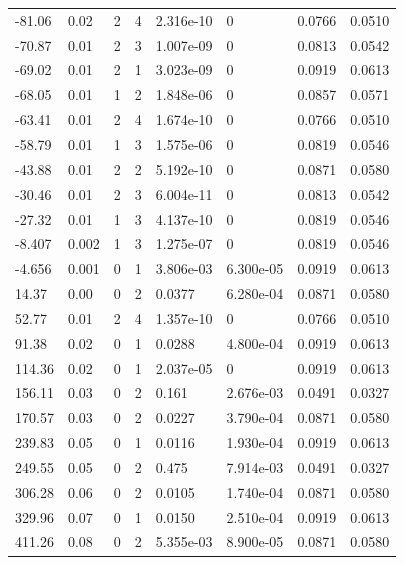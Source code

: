 \documentclass[preview]{standalone}
\begin{document}
{{\begin{tabular}{L{1.2cm}C{1.2cm} C{0.3cm}C{0.5cm} C{1.4cm}C{1.4cm} C{1.4cm}C{1.4cm}}
  -81.06  &  0.02  & 2     &  4 &  2.316e-10  & 0  & 0.0766 &  0.0510   \\ 
  -70.87  &  0.01  & 2     &  3 &  1.007e-09  & 0  & 0.0813 &  0.0542   \\ 
  -69.02  &  0.01  & 2     &  1 &  3.023e-09  & 0  & 0.0919 &  0.0613   \\ 
  -68.05  &  0.01  & 1     &  2 &  1.848e-06  & 0  & 0.0857 &  0.0571   \\ 
  -63.41  &  0.01  & 2     &  4 &  1.674e-10  & 0  & 0.0766 &  0.0510   \\ 
  -58.79  &  0.01  & 1     &  3 &  1.575e-06  & 0  & 0.0819 &  0.0546   \\ 
  -43.88  &  0.01  & 2     &  2 &  5.192e-10  & 0  & 0.0871 &  0.0580   \\ 
  -30.46  &  0.01  & 2     &  3 &  6.004e-11  & 0  & 0.0813 &  0.0542   \\ 
  -27.32  &  0.01  & 1     &  3 &  4.137e-10  & 0  & 0.0819 &  0.0546   \\ 
  -8.407  &  0.002  & 1     &  3 &  1.275e-07  & 0  & 0.0819 &  0.0546   \\ 
  -4.656  &  0.001  & 0     &  1 &  3.806e-03  & 6.300e-05  & 0.0919 &  0.0613   \\ 
  14.37  &  0.00  & 0     &  2 &  0.0377  & 6.280e-04  & 0.0871 &  0.0580   \\ 
  52.77  &  0.01  & 2     &  4 &  1.357e-10  & 0  & 0.0766 &  0.0510   \\ 
  91.38  &  0.02  & 0     &  1 &  0.0288  & 4.800e-04  & 0.0919 &  0.0613   \\ 
  114.36  &  0.02  & 0     &  1 &  2.037e-05  & 0  & 0.0919 &  0.0613   \\ 
  156.11  &  0.03  & 0     &  2 &  0.161  & 2.676e-03  & 0.0491 &  0.0327   \\ 
  170.57  &  0.03  & 0     &  2 &  0.0227  & 3.790e-04  & 0.0871 &  0.0580   \\ 
  239.83  &  0.05  & 0     &  1 &  0.0116  & 1.930e-04  & 0.0919 &  0.0613   \\ 
  249.55  &  0.05  & 0     &  2 &  0.475  & 7.914e-03  & 0.0491 &  0.0327   \\ 
  306.28  &  0.06  & 0     &  2 &  0.0105  & 1.740e-04  & 0.0871 &  0.0580   \\ 
  329.96  &  0.07  & 0     &  1 &  0.0150  & 2.510e-04  & 0.0919 &  0.0613   \\ 
  411.26  &  0.08  & 0     &  2 &  5.355e-03  & 8.900e-05  & 0.0871 &  0.0580   \\ 

\end{tabular}}}
\end{document}
